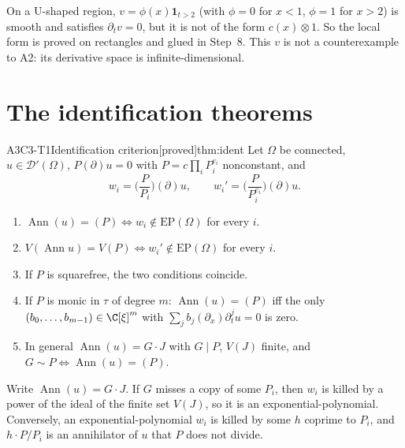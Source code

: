 \documentclass[11pt,a4paper,oneside]{report}
\newcommand{\badge}[2]{\textcolor{#1}{\textsf{\footnotesize[#2]}}}
\newcommand{\proved}{\badge{cC}{proved}}
\newcommand{\Ann}{\operatorname{Ann}}
\newcommand{\EP}{\mathrm{EP}}
\newcommand{\Var}{V}
\newenvironment{dimcard}[5]{\par\Needspace{12\baselineskip}\begin{dimcardbox}{#1}{#2}{#3}{#4}{#5}}{\end{dimcardbox}}
\begin{document}
\begin{caution}[title={Why rectangles in Step~6}]
On a U-shaped region, $v=\phi(x)\mathbf 1_{t>2}$ (with $\phi=0$ for $x<1$, $\phi=1$ for $x>2$) is smooth and satisfies $\partial_tv=0$, but it is not of the form $c(x)\otimes1$. So the local form is proved on rectangles and glued in Step~8. This $v$ is not a counterexample to A2: its derivative space is infinite-dimensional.
\end{caution}

\section{The identification theorems}

\begin{dimcard}{A3}{C3-T1}{Identification criterion}{\proved}{thm:ident}
Let $\Omega$ be connected, $u\in\mathcal D'(\Omega)$, $P(\partial)u=0$ with $P=c\prod_iP_i^{e_i}$ nonconstant, and
\[
w_i=\Big(\frac{P}{P_i}\Big)(\partial)u,\qquad w_i'=\Big(\frac{P}{P_i^{e_i}}\Big)(\partial)u .
\]
\begin{enumerate}[label=(\alph*)]
\item $\Ann(u)=(P)\iff w_i\notin\EP(\Omega)$ for every $i$.
\item $\Var(\Ann u)=\Var(P)\iff w_i'\notin\EP(\Omega)$ for every $i$.
\item If $P$ is squarefree, the two conditions coincide.
\item If $P$ is monic in $\tau$ of degree $m$: $\Ann(u)=(P)$ iff the only $(b_0,\dots,b_{m-1})\in\C[\xi]^m$ with $\sum_jb_j(\partial_x)\partial_t^ju=0$ is zero.
\item In general $\Ann(u)=G\cdot J$ with $G\mid P$, $\Var(J)$ finite, and $G\sim P\iff\Ann(u)=(P)$.
\end{enumerate}
\end{dimcard}

\begin{proofidea}
Write $\Ann(u)=G\cdot J$. If $G$ misses a copy of some $P_i$, then $w_i$ is killed by a power of the ideal of the finite set $\Var(J)$, so it is an exponential-polynomial. Conversely, an exponential-polynomial $w_i$ is killed by some $h$ coprime to $P_i$, and $h\cdot P/P_i$ is an annihilator of $u$ that $P$ does not divide.
\end{proofidea}
\end{document}
